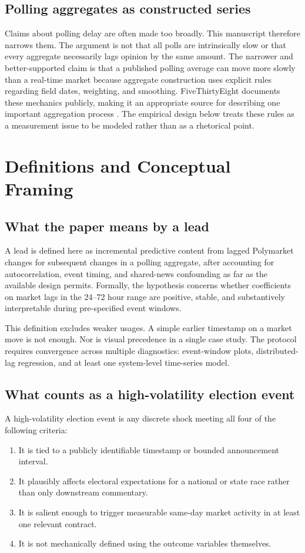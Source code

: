 \documentclass[11pt]{article}
\begin{document}
\subsection{Polling aggregates as constructed series}
Claims about polling delay are often made too broadly. This manuscript therefore narrows them. The argument is not that all polls are intrinsically slow or that every aggregate necessarily lags opinion by the same amount. The narrower and better-supported claim is that a published polling average can move more slowly than a real-time market because aggregate construction uses explicit rules regarding field dates, weighting, and smoothing. FiveThirtyEight documents these mechanics publicly, making it an appropriate source for describing one important aggregation process \citep{howourpollingavera2023fivethir}. The empirical design below treats these rules as a measurement issue to be modeled rather than as a rhetorical point.

\section{Definitions and Conceptual Framing}

\subsection{What the paper means by a lead}
A lead is defined here as incremental predictive content from lagged Polymarket changes for subsequent changes in a polling aggregate, after accounting for autocorrelation, event timing, and shared-news confounding as far as the available design permits. Formally, the hypothesis concerns whether coefficients on market lags in the 24--72 hour range are positive, stable, and substantively interpretable during pre-specified event windows.

This definition excludes weaker usages. A simple earlier timestamp on a market move is not enough. Nor is visual precedence in a single case study. The protocol requires convergence across multiple diagnostics: event-window plots, distributed-lag regression, and at least one system-level time-series model.

\subsection{What counts as a high-volatility election event}
A high-volatility election event is any discrete shock meeting all four of the following criteria:
\begin{enumerate}
\item It is tied to a publicly identifiable timestamp or bounded announcement interval.
\item It plausibly affects electoral expectations for a national or state race rather than only downstream commentary.
\item It is salient enough to trigger measurable same-day market activity in at least one relevant contract.
\item It is not mechanically defined using the outcome variables themselves.
\end{enumerate}
\end{document}
